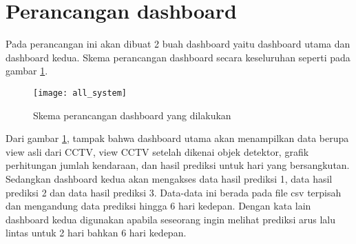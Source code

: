 \documentclass[../thesis.tex]{subfiles}
\begin{document}
\section{Perancangan dashboard}
Pada perancangan ini akan dibuat 2 buah dashboard yaitu dashboard utama dan dashboard kedua. Skema perancangan dashboard secara keseluruhan seperti pada gambar \ref{all_system}.
\begin{figure}[htp]
	\centering
	\texttt{[image: all\_system]}
	\caption{Skema perancangan dashboard yang dilakukan}
	\label{all_system}
\end{figure}

Dari gambar \ref{all_system}, tampak bahwa dashboard utama akan menampilkan data berupa view asli dari CCTV, view CCTV setelah dikenai objek detektor, grafik perhitungan jumlah kendaraan, dan hasil prediksi untuk hari yang bersangkutan.
Sedangkan dashboard kedua akan mengakses data hasil prediksi 1, data hasil prediksi 2 dan data hasil prediksi 3. Data-data ini berada pada file csv terpisah dan mengandung data prediksi hingga 6 hari kedepan. Dengan kata lain dashboard kedua digunakan
apabila seseorang ingin melihat prediksi arus lalu lintas untuk 2 hari bahkan 6 hari kedepan.
\end{document}

